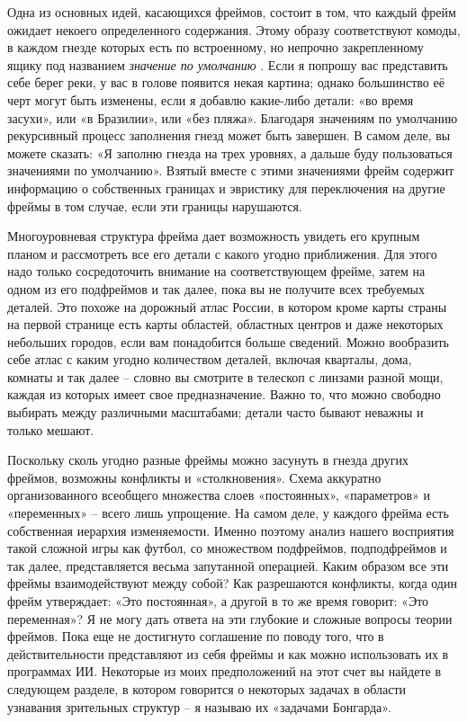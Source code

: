 \documentclass[../main.tex]{subfiles}
\begin{document}
Одна из основных идей, касающихся фреймов, состоит в том, что каждый фрейм ожидает некоего определенного содержания. Этому образу соответствуют комоды, в каждом гнезде которых есть по встроенному, но непрочно закрепленному ящику под названием \emph{значение по умолчанию} . Если я попрошу вас представить себе берег реки, у вас в голове появится некая картина; однако большинство её черт могут быть изменены, если я добавлю какие-либо детали: «во время засухи», или «в Бразилии», или «без пляжа». Благодаря значениям по умолчанию рекурсивный процесс заполнения гнезд может быть завершен. В самом деле, вы можете сказать: «Я заполню гнезда на трех уровнях, а дальше буду пользоваться значениями по умолчанию». Взятый вместе с этими значениями фрейм содержит информацию о собственных границах и эвристику для переключения на другие фреймы в том случае, если эти границы нарушаются.

Многоуровневая структура фрейма дает возможность увидеть его крупным планом и рассмотреть все его детали с какого угодно приближения. Для этого надо только сосредоточить внимание на соответствующем фрейме, затем на одном из его подфреймов и так далее, пока вы не получите всех требуемых деталей. Это похоже на дорожный атлас России, в котором кроме карты страны на первой странице есть карты областей, областных центров и даже некоторых небольших городов, если вам понадобится больше сведений. Можно вообразить себе атлас с каким угодно количеством деталей, включая кварталы, дома, комнаты и так далее \--- словно вы смотрите в телескоп с линзами разной мощи, каждая из которых имеет свое предназначение. Важно то, что можно свободно выбирать между различными масштабами; детали часто бывают неважны и только мешают.

Поскольку сколь угодно разные фреймы можно засунуть в гнезда других фреймов, возможны конфликты и «столкновения». Схема аккуратно организованного всеобщего множества слоев «постоянных», «параметров» и «переменных» \--- всего лишь упрощение. На самом деле, у каждого фрейма есть собственная иерархия изменяемости. Именно поэтому анализ нашего восприятия такой сложной игры как футбол, со множеством подфреймов, подподфреймов и так далее, представляется весьма запутанной операцией. Каким образом все эти фреймы взаимодействуют между собой? Как разрешаются конфликты, когда один фрейм утверждает: «Это постоянная», а другой в то же время говорит: «Это переменная»? Я не могу дать ответа на эти глубокие и сложные вопросы теории фреймов. Пока еще не достигнуто соглашение по поводу того, что в действительности представляют из себя фреймы и как можно использовать их в программах ИИ\@. Некоторые из моих предположений на этот счет вы найдете в следующем разделе, в котором говорится о некоторых задачах в области узнавания зрительных структур \--- я называю их «задачами Бонгарда».
\end{document}
